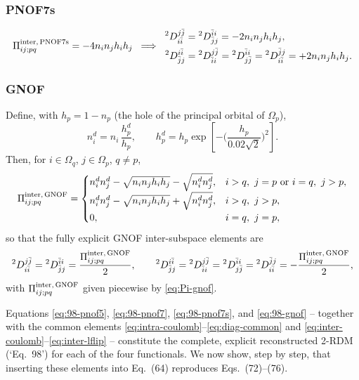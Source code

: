 \documentclass[11pt,a4paper]{article}
\newcommand{\Dtwo}{{}^2D}
\newcommand{\PiMat}{\Pi}
\newcommand{\Om}{\Omega}
\newcommand{\hi}{h_i}
\newcommand{\hj}{h_j}
\begin{document}
\subsubsection{PNOF7s}
\begin{equation}
\PiMat^{\rm inter,\,PNOF7s}_{ij;pq}=-4n_in_j\hi\hj
\;\;\Longrightarrow\;\;
\begin{aligned}
\Dtwo^{j\bar j}_{i\bar i}&=\Dtwo^{\bar ii}_{\bar jj}
=-2n_in_j\hi\hj,\\
\Dtwo^{i\bar i}_{\bar jj}&=\Dtwo^{j\bar j}_{\bar ii}
=\Dtwo^{\bar ii}_{j\bar j}=\Dtwo^{\bar jj}_{i\bar i}
=+2n_in_j\hi\hj.
\end{aligned}
\label{eq:98-pnof7s}
\end{equation}

\subsubsection{GNOF}
Define, with $h_p=1-n_p$ (the hole of the principal orbital of
$\Om_p$),
\begin{equation}
 n_i^d=n_i\,\frac{h_p^d}{h_p},
 \qquad
 h_p^d=h_p\exp\!\left[-\Big(\frac{h_p}{0.02\sqrt2}\Big)^2\right].
\end{equation}
Then, for $i\in\Om_q$, $j\in\Om_p$, $q\neq p$,
\begin{equation}
\PiMat^{\rm inter,\,GNOF}_{ij;pq}=
\begin{cases}
n_i^dn_j^d-\sqrt{n_in_j\hi\hj}-\sqrt{n_i^dn_j^d}, & i>q,\ j=p\ \text{or}\ i=q,\ j>p,\\[1mm]
n_i^dn_j^d-\sqrt{n_in_j\hi\hj}+\sqrt{n_i^dn_j^d}, & i>q,\ j>p,\\[1mm]
0, & i=q,\ j=p,
\end{cases}
\label{eq:Pi-gnof}
\end{equation}
so that the fully explicit GNOF inter-subspace elements are
\begin{equation}
\Dtwo^{j\bar j}_{i\bar i}=\Dtwo^{\bar ii}_{\bar jj}
=\frac{\PiMat^{\rm inter,\,GNOF}_{ij;pq}}{2},
\qquad
\Dtwo^{i\bar i}_{\bar jj}=\Dtwo^{j\bar j}_{\bar ii}
=\Dtwo^{\bar ii}_{j\bar j}=\Dtwo^{\bar jj}_{i\bar i}
=-\frac{\PiMat^{\rm inter,\,GNOF}_{ij;pq}}{2},
\label{eq:98-gnof}
\end{equation}
with $\PiMat^{\rm inter,\,GNOF}_{ij;pq}$ given piecewise by
\eqref{eq:Pi-gnof}.

Equations \eqref{eq:98-pnof5}, \eqref{eq:98-pnof7},
\eqref{eq:98-pnof7s}, and \eqref{eq:98-gnof} -- together with the
common elements \eqref{eq:intra-coulomb}--\eqref{eq:diag-common} and
\eqref{eq:inter-coulomb}--\eqref{eq:inter-lflip} -- constitute the
complete, explicit reconstructed 2-RDM (`Eq.~98') for each of the
four functionals. We now show, step by step, that inserting these
elements into Eq.~(64) reproduces Eqs.~(72)--(76).
\end{document}
